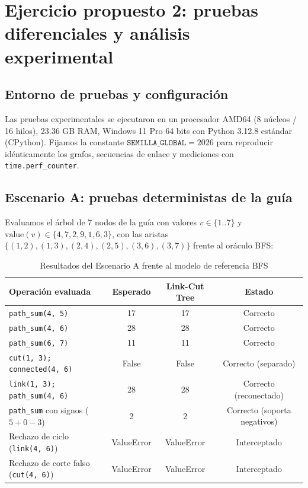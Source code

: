 \section{Ejercicio propuesto 2: pruebas diferenciales y análisis experimental}

\subsection{Entorno de pruebas y configuración}
Las pruebas experimentales se ejecutaron en un procesador AMD64 (8 núcleos / 16 hilos), 23.36 GB RAM, Windows 11 Pro 64 bits con Python 3.12.8 estándar (CPython). Fijamos la constante $\texttt{SEMILLA\_GLOBAL} = 2026$ para reproducir idénticamente los grafos, secuencias de enlace y mediciones con \texttt{time.perf\_counter}.

\subsection{Escenario A: pruebas deterministas de la guía}
Evaluamos el árbol de 7 nodos de la guía con valores $v \in \{1..7\}$ y $\text{value}(v) \in \{4, 7, 2, 9, 1, 6, 3\}$, con las aristas $\{(1, 2), (1, 3), (2, 4), (2, 5), (3, 6), (3, 7)\}$ frente al oráculo BFS:

\begin{table}[H]
    \caption{Resultados del Escenario A frente al modelo de referencia BFS}
    \label{tab:escenario_a}
    \centering
    \footnotesize
    \begin{tabular*}{\textwidth}{@{\extracolsep{\fill}}lccc}
        \toprule
        \textbf{Operación evaluada} & \textbf{Esperado} & \textbf{Link-Cut Tree} & \textbf{Estado} \\
        \midrule
        \texttt{path\_sum(4, 5)}       & 17 & 17 & Correcto \\
        \texttt{path\_sum(4, 6)}       & 28 & 28 & Correcto \\
        \texttt{path\_sum(6, 7)}       & 11 & 11 & Correcto \\
        \texttt{cut(1, 3); connected(4, 6)} & False & False & Correcto (separado) \\
        \texttt{link(1, 3); path\_sum(4, 6)}& 28 & 28 & Correcto (reconectado) \\
        \texttt{path\_sum} con signos ($5 + 0 - 3$) & 2 & 2 & Correcto (soporta negativos) \\
        Rechazo de ciclo (\texttt{link(4, 6)}) & ValueError & ValueError & Interceptado \\
        Rechazo de corte falso (\texttt{cut(4, 6)}) & ValueError & ValueError & Interceptado \\
        \bottomrule
    \end{tabular*}
\end{table}

